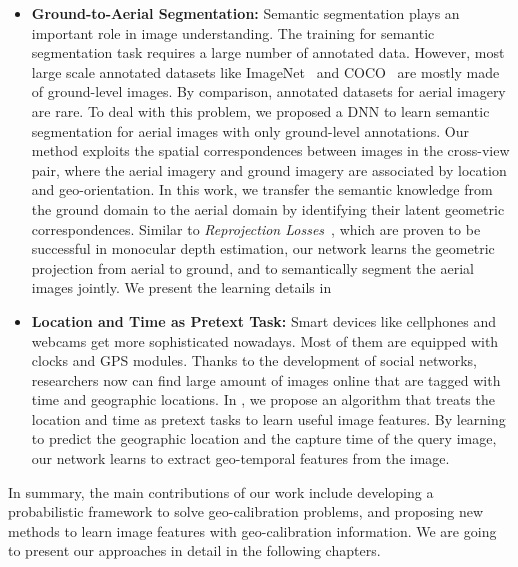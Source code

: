 \begin{itemize}[noitemsep]
  \item \textbf{Ground-to-Aerial Segmentation:}
  Semantic segmentation plays an important role in image understanding.
  The training for semantic segmentation task requires a large number
  of annotated data.
  However, most large scale annotated datasets like ImageNet~\cite{ILSVRC15}
  and COCO~\cite{lin2014microsoft} are mostly made of ground-level
  images. By comparison, annotated datasets for aerial imagery are rare.
  To deal with this problem, we proposed a
  DNN to learn semantic segmentation for aerial images with only
  ground-level annotations. Our method exploits the spatial
  correspondences between images in the cross-view pair, where the
  aerial imagery and ground imagery are associated by location and
  geo-orientation.
  In this work, we transfer the semantic knowledge from the
  ground domain to the aerial domain by identifying their latent
  geometric correspondences. Similar to {\em
  Reprojection Losses}~\cite{garg2016unsupervised,
  godard2017unsupervised,zhou2017unsupervised, yan2016perspective},
  which are proven to be successful in monocular depth estimation,
  our network learns the geometric projection from aerial to ground, and
  to semantically segment the aerial images jointly.
  We present the learning details in 
  \newline

  \item \textbf{Location and Time as Pretext Task:}
  Smart devices like cellphones and webcams get more sophisticated
  nowadays. Most of them are equipped with clocks and GPS modules. Thanks to
  the development of social networks, researchers now can find
  large amount of images online that are tagged with time and
  geographic locations. In , we propose an
  algorithm that treats the location and time as pretext tasks to learn
  useful image features.  By learning to predict the geographic location
  and the capture time of the query image, our network learns to extract
  geo-temporal features from the image.

\end{itemize}


In summary, the main contributions of our work include developing a
probabilistic framework to solve geo-calibration problems, and
proposing new methods to learn image features with geo-calibration
information. We are going to present our approaches in detail in the
following chapters.
